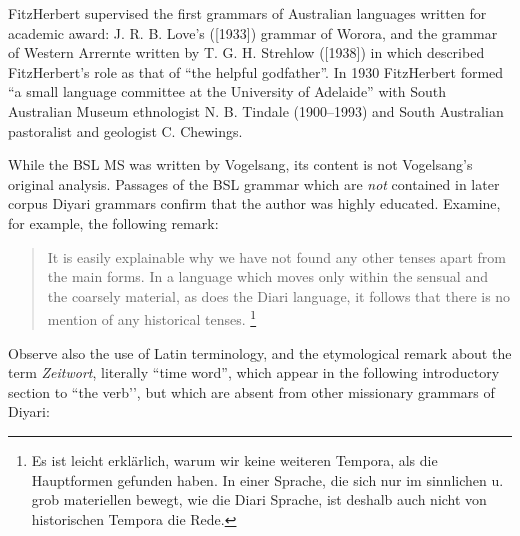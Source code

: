 FitzHerbert supervised the first grammars of Australian languages written for academic award: J. R. B. Love’s (\citeyear{love_outline_1938}[1933]) grammar of Worora, and the grammar of Western Arrernte written by T. G. H. Strehlow (\citeyear{strehlow_aranda_1944}[1938]) in which \citet[1]{elkin_introduction_1944} described FitzHerbert’s role as that of “the helpful godfather”. In 1930 FitzHerbert formed “a small language committee at the University of Adelaide” \citep[261]{tindale_legend_1935} with South Australian Museum ethnologist N. B. Tindale (1900–1993) and South Australian pastoralist and geologist C. Chewings.

While the BSL MS was written by Vogelsang, its content is not Vogelsang’s original analysis. Passages of the BSL grammar which are \textit{not} contained in later corpus Diyari grammars confirm that the author was highly educated. Examine, for example, the following remark:

\begin{quote}
It is easily explainable why we have not found any other tenses apart from the main forms. In a language which moves only within the sensual and the coarsely material, as does the Diari language, it follows that there is no mention of any historical tenses. \citep[no pag.]{koch_untitled_1868}\footnote{Es ist leicht erklärlich, warum wir keine weiteren Tempora, als die Hauptformen gefunden haben. In einer Sprache, die sich nur im sinnlichen u. grob materiellen bewegt, wie die Diari Sprache, ist deshalb auch nicht von historischen Tempora die Rede.}
\end{quote}


Observe also the use of Latin terminology, and the etymological remark about the term \textit{Zeitwort}, literally “time word'', which appear in the following introductory section to “the verb’', but which are absent from other missionary grammars of Diyari:

